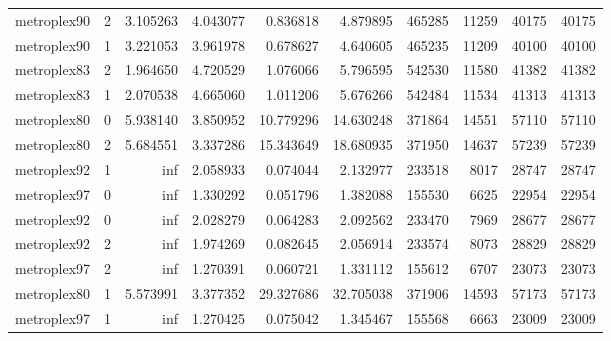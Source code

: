 \begin{longtable}{|l|r|r|r|r|r|r|r|r|r|}
metroplex90 & 2 & 3.105263 & 4.043077 & 0.836818 & 4.879895 & 465285 & 11259 & 40175 & 40175 \\
metroplex90 & 1 & 3.221053 & 3.961978 & 0.678627 & 4.640605 & 465235 & 11209 & 40100 & 40100 \\
metroplex83 & 2 & 1.964650 & 4.720529 & 1.076066 & 5.796595 & 542530 & 11580 & 41382 & 41382 \\
metroplex83 & 1 & 2.070538 & 4.665060 & 1.011206 & 5.676266 & 542484 & 11534 & 41313 & 41313 \\
metroplex80 & 0 & 5.938140 & 3.850952 & 10.779296 & 14.630248 & 371864 & 14551 & 57110 & 57110 \\
metroplex80 & 2 & 5.684551 & 3.337286 & 15.343649 & 18.680935 & 371950 & 14637 & 57239 & 57239 \\
metroplex92 & 1 & inf & 2.058933 & 0.074044 & 2.132977 & 233518 & 8017 & 28747 & 28747 \\
metroplex97 & 0 & inf & 1.330292 & 0.051796 & 1.382088 & 155530 & 6625 & 22954 & 22954 \\
metroplex92 & 0 & inf & 2.028279 & 0.064283 & 2.092562 & 233470 & 7969 & 28677 & 28677 \\
metroplex92 & 2 & inf & 1.974269 & 0.082645 & 2.056914 & 233574 & 8073 & 28829 & 28829 \\
metroplex97 & 2 & inf & 1.270391 & 0.060721 & 1.331112 & 155612 & 6707 & 23073 & 23073 \\
metroplex80 & 1 & 5.573991 & 3.377352 & 29.327686 & 32.705038 & 371906 & 14593 & 57173 & 57173 \\
metroplex97 & 1 & inf & 1.270425 & 0.075042 & 1.345467 & 155568 & 6663 & 23009 & 23009 \\
\end{longtable}
